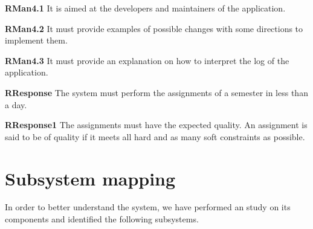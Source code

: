 \begin{description}
\begin{description}
                \begin{description}
                    \item \textbf{RMan4.1} It is aimed at the developers and maintainers of the application.
                    \item \textbf{RMan4.2} It must provide examples of possible changes with some directions to implement them. 
                    \item \textbf{RMan4.3} It must provide an explanation on how to interpret the log of the application. 
                \end{description}
        \end{description}

    \item \textbf{RResponse} The system must perform the assignments of a semester in less than a day.
        \begin{description}
            \item \textbf{RResponse1} The assignments must have the expected quality. An assignment is said to be of quality if it meets all hard and as many soft constraints as possible.
        \end{description}

\end{description}



\section{Subsystem mapping}

In order to better understand the system, we have performed an study on its components and identified the following subsystems.

